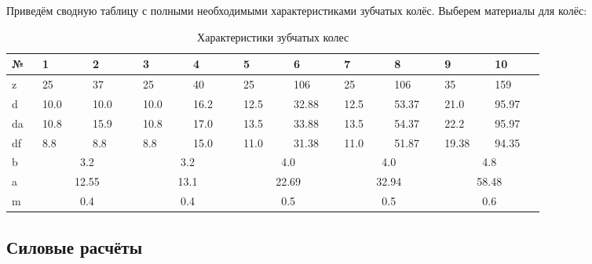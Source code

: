 \documentclass[14pt,a4paper,russian]{scrartcl}
\begin{document}
        Приведём сводную таблицу с полными необходимыми характеристиками зубчатых колёс.
        Выберем материалы для колёс:
        \begin{table}[h!]
            \begin{center}
                \begin{tabular}{p{0.04\linewidth}|p{0.075\linewidth}p{0.075\linewidth}p{0.075\linewidth}p{0.075\linewidth}p{0.075\linewidth}p{0.075\linewidth}p{0.075\linewidth}p{0.075\linewidth}p{0.075\linewidth}p{0.075\linewidth}}
                    \hline
                    №   & 1&2&3&4&5&6&7&8&9&10\\
                    \hline
                    z & 25 & 37 & 25 & 40 & 25 & 106 & 25 & 106 & 35 & 159 \\
                    d & 10.0 & 10.0 & 10.0 & 16.2 & 12.5 & 32.88 & 12.5 & 53.37 & 21.0 & 95.97 \\
                    da & 10.8 & 15.9 & 10.8 & 17.0 & 13.5 & 33.88 & 13.5 & 54.37 & 22.2 & 95.97 \\
                    df & 8.8 & 8.8 & 8.8 & 15.0 & 11.0 & 31.38 & 11.0 & 51.87 & 19.38 & 94.35 \\
                    b & \multicolumn{2}{c}{3.2} &  \multicolumn{2}{c}{3.2} &  \multicolumn{2}{c}{4.0} & \multicolumn{2}{c}{4.0} &\multicolumn{2}{c}{4.8} \\
                    a & \multicolumn{2}{c}{12.55} & \multicolumn{2}{c}{13.1} & \multicolumn{2}{c}{22.69} & \multicolumn{2}{c}{32.94} & \multicolumn{2}{c}{58.48} \\
                    m & \multicolumn{2}{c}{0.4} & \multicolumn{2}{c}{0.4} & \multicolumn{2}{c}{0.5} & \multicolumn{2}{c}{0.5} & \multicolumn{2}{c}{0.6} \\
                    \hline
                \end{tabular}
                \caption{{Характеристики зубчатых колес}}\label{tab:gears_digest}
            \end{center}
        \end{table}

    
\subsection{Силовые расчёты}
\end{document}
